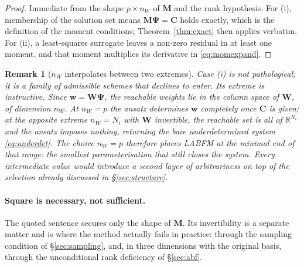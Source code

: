 \documentclass[11pt,a4paper]{article}
\newtheorem{remark}{Remark}
\begin{document}
\begin{proof}
Immediate from the shape $p\times n_W$ of $\bm M$ and the rank hypothesis. For (i),
membership of the solution set means $\bm M\bm\Psi=\bm C$ holds exactly, which is the
definition of the moment conditions; Theorem~\ref{thm:exact} then applies verbatim. For
(ii), a least-squares surrogate leaves a non-zero residual in at least one moment, and
that moment multiplies its derivative in \eqref{eq:momexpand}.
\end{proof}

\begin{remark}[$n_W$ interpolates between two extremes]
\label{rem:nW}
Case (i) is not pathological; it is a family of admissible schemes that
\cite{KLN2020} declines to enter. Its extreme is instructive. Since
$\bm w=\bm W\bm\Psi$, the reachable weights lie in the column space of $\bm W$, of
dimension $n_W$. At $n_W=p$ the ansatz determines $\bm w$ completely once $\bm C$ is
given; at the opposite extreme $n_W=N_i$ with $\bm W$ invertible, the reachable set is
all of $\mathbb R^{N_i}$ and the ansatz imposes \emph{nothing}, returning the bare
underdetermined system \eqref{eq:underdet}. The choice $n_W=p$ therefore places LABFM at
the minimal end of that range: the smallest parameterisation that still closes the
system. Every intermediate value would introduce a second layer of arbitrariness on top
of the selection already discussed in \S\ref{sec:structure}.
\end{remark}

\paragraph{Square is necessary, not sufficient.} The quoted sentence secures only the
shape of $\bm M$. Its invertibility is a separate matter and is where the method
actually fails in practice: through the sampling condition of \S\ref{sec:sampling}, and,
in three dimensions with the original basis, through the unconditional rank deficiency
of \S\ref{sec:abf}.
\end{document}
